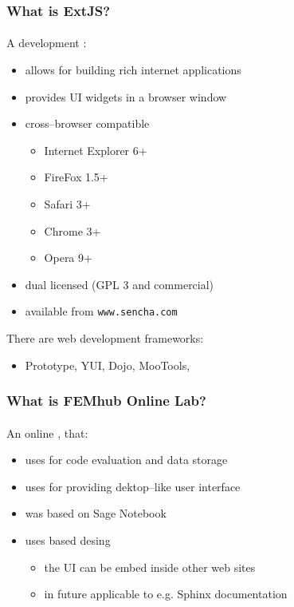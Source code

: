 \documentclass{beamer}
\begin{document}
\begin{frame}
    \frametitle{What is ExtJS?}
    \framesubtitle{}

    A  development :
    \begin{itemize}
        \pause
        \item allows for building rich internet applications
        \pause
        \item provides UI widgets in a browser window
        \pause
        \item cross--browser compatible
            \begin{itemize}
                \item Internet Explorer 6+
                \item FireFox 1.5+
                \item Safari 3+
                \item Chrome 3+
                \item Opera 9+
            \end{itemize}
        \pause
        \item dual licensed (GPL 3 and commercial)
        \pause
        \item available from \texttt{www.sencha.com}
    \end{itemize}
    \pause
    There are  web development frameworks:
    \begin{itemize}
        \pause
        \item Prototype, YUI, Dojo, MooTools, \structure{\ldots}
    \end{itemize}
\end{frame}

\begin{frame}
    \frametitle{What is FEMhub Online Lab?}
    \framesubtitle{}

    An  online , that:
    \begin{itemize}
        \pause
        \item uses  for code evaluation and data storage
        \pause
        \item uses  for providing dektop--like user interface
        \pause
        \item was  based on Sage Notebook
        \pause
        \item uses  based desing
            \begin{itemize}
                \pause
                \item the UI can be embed inside other web sites
                \pause
                \item in future applicable to e.g. Sphinx documentation
            \end{itemize}
    \end{itemize}
\end{frame}
\end{document}
